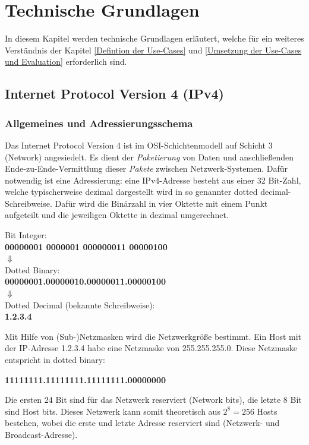 \chapter{Technische Grundlagen} \label{Technische_Grundlagen}

In diesem Kapitel werden technische Grundlagen erläutert, welche für ein weiteres Verständnis der Kapitel \ref{Defintion der Use-Cases} und \ref{Umsetzung der Use-Cases und Evaluation} erforderlich sind.
\section{Internet Protocol Version 4 (IPv4)} \label{ipv4}

\subsection{Allgemeines und Adressierungsschema}
Das Internet Protocol Version 4 ist im \gls{OSI-Schichtenmodell} auf Schicht 3 (Network) angesiedelt\cite{itu1994}. Es dient der \textit{Paketierung} von Daten und anschließenden Ende-zu-Ende-Vermittlung dieser \textit{Pakete} zwischen Netzwerk-Systemen. Dafür notwendig ist eine Adressierung: eine IPv4-Adresse besteht aus einer 32 Bit-Zahl, welche typischerweise dezimal dargestellt wird in so genannter \glqq dotted decimal\grqq{}-Schreibweise. Dafür wird die Binärzahl in vier Oktette mit einem Punkt aufgeteilt und die jeweiligen Oktette in dezimal umgerechnet.

{ Bit Integer:\\
\textbf{00000001 0000001 000000011 00000100}\\
$\Downarrow$\\
\glqq Dotted Binary\grqq{}:\\
\textbf{00000001.00000010.00000011.00000100}\\
$\Downarrow$\\
Dotted Decimal (bekannte Schreibweise):\\
{\textbf{1.2.3.4}}\par}

Mit Hilfe von (Sub-)Netzmasken wird die Netzwerkgröße bestimmt. Ein Host mit der IP-Adresse 1.2.3.4 habe eine Netzmaske von 255.255.255.0. Diese Netzmaske entspricht in dotted binary:

{\centering\textbf{11111111.11111111.11111111.00000000}\par}

Die ersten 24 Bit sind für das Netzwerk reserviert (Network bits), die letzte 8 Bit sind Host bits. Dieses Netzwerk kann somit theoretisch aus $2^8 = 256$ Hosts bestehen, wobei die erste und letzte Adresse reserviert sind (Netzwerk- und Broadcast-Adresse).


